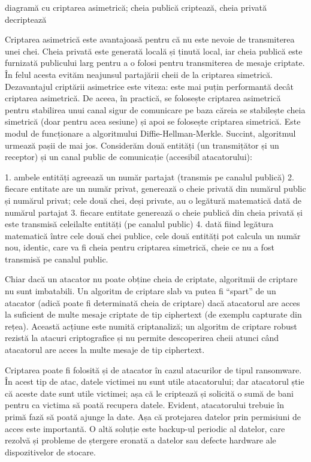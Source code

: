 diagramă cu criptarea asimetrică; cheia publică criptează, cheia privată decriptează

Criptarea asimetrică este avantajoasă pentru că nu este nevoie de transmiterea unei chei. Cheia privată este generată locală și ținută local, iar cheia publică este furnizată publicului larg pentru a o folosi pentru transmiterea de mesaje criptate. În felul acesta evităm neajunsul partajării cheii de la criptarea simetrică. Dezavantajul criptării asimetrice este viteza: este mai puțin performantă decât criptarea asimetrică. De aceea, în practică, se folosește criptarea asimetrică pentru stabilirea unui canal sigur de comunicare pe baza căreia se stabilește cheia simetrică (doar pentru acea sesiune) și apoi se folosește criptarea simetrică. Este modul de funcționare a algoritmului Diffie-Hellman-Merkle. Succint, algoritmul urmează pașii de mai jos. Considerăm două entități (un transmițător și un receptor) și un canal public de comunicație (accesibil atacatorului):

1. ambele entități agreează un număr partajat (transmis pe canalul publică)
2. fiecare entitate are un număr privat, generează o cheie privată din numărul public și numărul privat; cele două chei, deși private, au o legătură matematică dată de numărul partajat
3. fiecare entitate generează o cheie publică din cheia privată și este transmisă celeilalte entități (pe canalul public)
4. dată fiind legătura matematică între cele două chei publice, cele două entități pot calcula un număr nou, identic, care va fi cheia pentru criptarea simetrică, cheie ce nu a fost transmisă pe canalul public.

Chiar dacă un atacator nu poate obține cheia de criptate, algoritmii de criptare nu sunt imbatabili. Un algoritm de criptare slab va putea fi “spart” de un atacator (adică poate fi determinată cheia de criptare) dacă atacatorul are acces la suficient de multe mesaje criptate de tip ciphertext (de exemplu capturate din rețea). Această acțiune este numită criptanaliză; un algoritm de criptare robust rezistă la atacuri criptografice și nu permite descoperirea cheii atunci când atacatorul are acces la multe mesaje de tip ciphertext.

Criptarea poate fi folosită și de atacator în cazul atacurilor de tipul ransomware. În acest tip de atac, datele victimei nu sunt utile atacatorului; dar atacatorul știe că aceste date sunt utile victimei; așa că le criptează și solicită o sumă de bani pentru ca victima să poată recupera datele. Evident, atacatorului trebuie în primă fază să poată ajunge la date. Așa că protejarea datelor prin permisiuni de acces este importantă. O altă soluție este backup-ul periodic al datelor, care rezolvă și probleme de ștergere eronată a datelor sau defecte hardware ale dispozitivelor de stocare.

